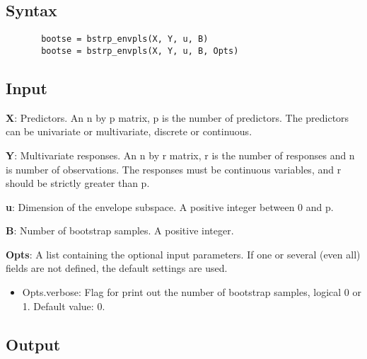 \documentclass[a4paper,11pt,openany]{memoir}
\begin{document}
\subsection*{Syntax}


\begin{verbatim}       bootse = bstrp_envpls(X, Y, u, B)
       bootse = bstrp_envpls(X, Y, u, B, Opts)\end{verbatim}
    

\subsection*{Input}

\begin{par}
\textbf{X}: Predictors. An n by p matrix, p is the number of predictors. The predictors can be univariate or multivariate, discrete or continuous.
\end{par} \vspace{1em}
\begin{par}
\textbf{Y}: Multivariate responses. An n by r matrix, r is the number of responses and n is number of observations. The responses must be continuous variables, and r should be strictly greater than p.
\end{par} \vspace{1em}
\begin{par}
\textbf{u}: Dimension of the envelope subspace.  A positive integer between 0 and p.
\end{par} \vspace{1em}
\begin{par}
\textbf{B}: Number of bootstrap samples.  A positive integer.
\end{par} \vspace{1em}
\begin{par}
\textbf{Opts}: A list containing the optional input parameters. If one or several (even all) fields are not defined, the default settings are used.
\end{par} \vspace{1em}
\begin{itemize}
\setlength{\itemsep}{-1ex}
   \item Opts.verbose: Flag for print out the number of bootstrap samples, logical 0 or 1. Default value: 0.
\end{itemize}


\subsection*{Output}
\end{document}
